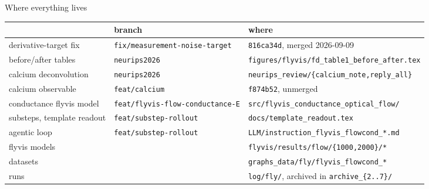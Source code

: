 \documentclass[aspectratio=169]{beamer}
\begin{document}
\begin{frame}{Where everything lives}
\vspace*{0.4cm}
\centering\scriptsize
\setlength{\tabcolsep}{6pt}
\begin{tabular}{lll}
\toprule
 & branch & where \\
\midrule
derivative-target fix & \texttt{fix/measurement-noise-target}
  & \texttt{816ca34d}, merged 2026-09-09 \\
before/after tables & \texttt{neurips2026}
  & \texttt{figures/flyvis/fd\_table1\_before\_after.tex} \\
calcium deconvolution & \texttt{neurips2026}
  & \texttt{neurips\_review/\{calcium\_note,reply\_all\}} \\
calcium observable & \texttt{feat/calcium}
  & \texttt{f874b52}, unmerged \\
conductance flyvis model & \texttt{feat/flyvis-flow-conductance-E}
  & \texttt{src/flyvis\_conductance\_optical\_flow/} \\
substeps, template readout & \texttt{feat/substep-rollout}
  & \texttt{docs/template\_readout.tex} \\
agentic loop & \texttt{feat/substep-rollout}
  & \texttt{LLM/instruction\_flyvis\_flowcond\_*.md} \\
\midrule
flyvis models & & \texttt{flyvis/results/flow/\{1000,2000\}/*} \\
datasets & & \texttt{graphs\_data/fly/flyvis\_flowcond\_*} \\
runs & & \texttt{log/fly/}, archived in \texttt{archive\_\{2..7\}/} \\
\bottomrule
\end{tabular}
\end{frame}
\end{document}
